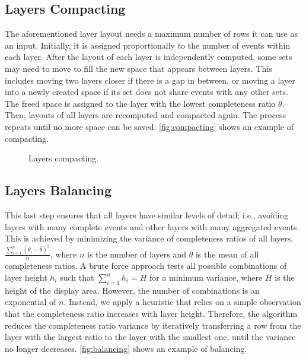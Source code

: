 \subsection{Layers Compacting}
\label{sub:compact}
The aforementioned layer layout needs a maximum number of rows it can use as an input. Initially, it is assigned proportionally to the number of events within each layer. After the layout of each layer is independently computed, some sets may need to move to fill the new space that appears between layers. This includes moving two layers closer if there is a gap in between, or moving a layer into a newly created space if its set does not share events with any other sets. The freed space is assigned to the layer with the lowest completeness ratio $\theta$. Then, layouts of all layers are recomputed and compacted again. The process repeats until no more space can be saved. \autoref{fig:compacting} shows an example of compacting.

\begin{figure}[!htb]
	\centering
	\hfill
	\caption{Layers compacting.}
	\label{fig:compacting}
\end{figure}

\subsection{Layers Balancing}
This last step ensures that all layers have similar levels of detail; i.e., avoiding layers with many complete events and other layers with many aggregated events. This is achieved by minimizing the variance of completeness ratios of all layers,
$\frac{\sum\limits_{i=1}^{n}(\theta_i - \bar{\theta})^2} {n}$, where $n$ is the number of layers and $\bar{\theta}$ is the mean of all completeness ratios. A brute force approach tests all possible combinations of layer height $h_i$ such that $\sum\limits_{i=1}^{n}h_i=H$ for a minimum variance, where $H$ is the height of the display area. However, the number of combinations is an exponential of $n$. Instead, we apply a heuristic that relies on a simple observation that the completeness ratio increases with layer height. Therefore, the algorithm reduces the completeness ratio variance by iteratively transferring a row from the layer with the largest ratio to the layer with the smallest one, until the variance no longer decreases. \autoref{fig:balancing} shows an example of balancing.

